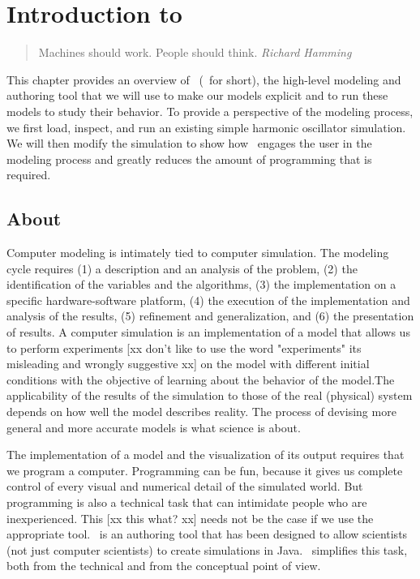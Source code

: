 \chapter{Introduction to \Ejs}\label{chapter:EjsIntro}
\begin{quote}
Machines should work. People should think.  {\em Richard Hamming}
\end{quote}

This chapter provides an overview of \Ejs\ (\ejs\ for short), the high-level modeling and authoring tool that we will use to make our models explicit and to run  these models  to study their behavior. To provide a
perspective of the modeling process, we first load, inspect, and run an existing simple harmonic oscillator
simulation. We will then modify the simulation to show how \ejs\ engages the user in the modeling process and greatly
reduces the amount of programming that is required.

  \section{About \Ejs}

Computer modeling is intimately tied to computer simulation.  The modeling cycle requires (1) a description and an analysis of
the problem, (2) the identification of the variables and the algorithms, (3) the implementation on a specific hardware-software
platform, (4) the execution of the implementation and analysis of the results, (5) refinement and generalization, and (6) the
presentation of results. A computer simulation is an implementation of a model  that allows us to perform experiments [xx don't like to use the word "experiments" its misleading and wrongly suggestive xx] on the
model with different initial conditions with the objective of learning about the behavior of the
model.The applicability of the results of the simulation to those of the real (physical)
system depends on how well the model describes reality. The process of devising more general and
more accurate models is what science is about.

The implementation of a model and the visualization of its output requires that we program a computer. Programming can be fun, because it gives us complete control of every visual and numerical detail of the simulated world. But programming is also a technical task that can intimidate people who are inexperienced. This [xx this what? xx] needs not be the case if we use the appropriate tool. \Ejs\ is an authoring tool that has been designed to allow scientists (not just computer scientists) to create simulations in Java. \ejs\ simplifies this task, both from the technical and from the conceptual point of view.

